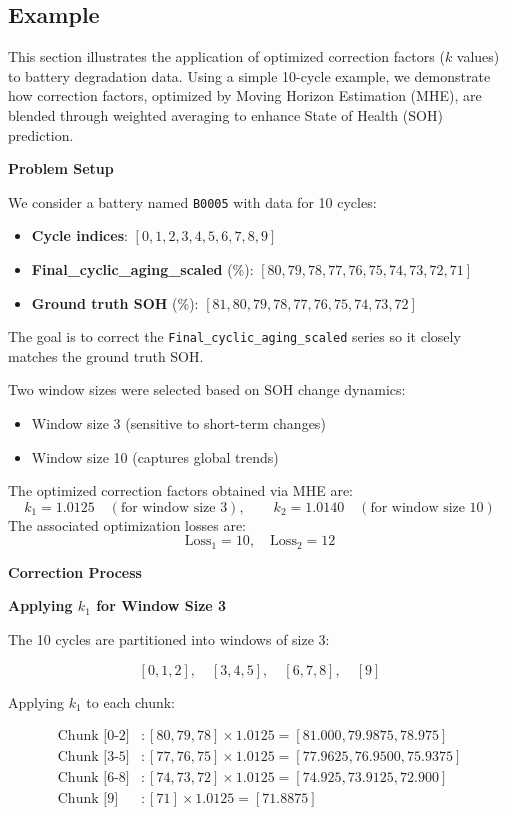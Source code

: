 \subsection{Example}
This section illustrates the application of optimized correction factors ($k$ values) to battery degradation data. Using a simple 10-cycle example, we demonstrate how correction factors, optimized by Moving Horizon Estimation (MHE), are blended through weighted averaging to enhance State of Health (SOH) prediction.

\textbf{Problem Setup}

We consider a battery named \texttt{B0005} with data for 10 cycles:

\begin{itemize}
    \item \textbf{Cycle indices}: $[0, 1, 2, 3, 4, 5, 6, 7, 8, 9]$
    \item \textbf{Final\_cyclic\_aging\_scaled} (\%): $[80, 79, 78, 77, 76, 75, 74, 73, 72, 71]$
    \item \textbf{Ground truth SOH} (\%): $[81, 80, 79, 78, 77, 76, 75, 74, 73, 72]$
\end{itemize}

The goal is to correct the \texttt{Final\_cyclic\_aging\_scaled} series so it closely matches the ground truth SOH.

Two window sizes were selected based on SOH change dynamics:
\begin{itemize}
    \item Window size 3 (sensitive to short-term changes)
    \item Window size 10 (captures global trends)
\end{itemize}

The optimized correction factors obtained via MHE are:
\[
k_1 = 1.0125 \quad (\text{for window size 3}), \qquad k_2 = 1.0140 \quad (\text{for window size 10})
\]
The associated optimization losses are:
\[
\text{Loss}_1 = 10, \quad \text{Loss}_2 = 12
\]

\textbf{Correction Process}

\textbf{Applying $k_1$ for Window Size 3}

The 10 cycles are partitioned into windows of size 3:

\[
[0,1,2],\quad [3,4,5],\quad [6,7,8],\quad [9]
\]

Applying $k_1$ to each chunk:

\begin{align*}
\text{Chunk [0-2]} &: [80, 79, 78] \times 1.0125 = [81.000, 79.9875, 78.975]\\
\text{Chunk [3-5]} &: [77, 76, 75] \times 1.0125 = [77.9625, 76.9500, 75.9375]\\
\text{Chunk [6-8]} &: [74, 73, 72] \times 1.0125 = [74.925, 73.9125, 72.900]\\
\text{Chunk [9]}   &: [71] \times 1.0125 = [71.8875]
\end{align*}


